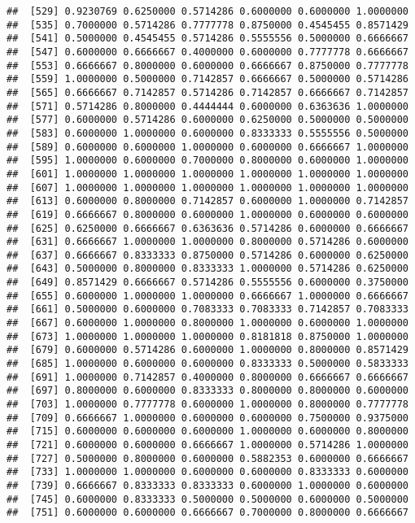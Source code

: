 \documentclass[]{article}
\begin{document}
\begin{verbatim}
##  [529] 0.9230769 0.6250000 0.5714286 0.6000000 0.6000000 1.0000000
##  [535] 0.7000000 0.5714286 0.7777778 0.8750000 0.4545455 0.8571429
##  [541] 0.5000000 0.4545455 0.5714286 0.5555556 0.5000000 0.6666667
##  [547] 0.6000000 0.6666667 0.4000000 0.6000000 0.7777778 0.6666667
##  [553] 0.6666667 0.8000000 0.6000000 0.6666667 0.8750000 0.7777778
##  [559] 1.0000000 0.5000000 0.7142857 0.6666667 0.5000000 0.5714286
##  [565] 0.6666667 0.7142857 0.5714286 0.7142857 0.6666667 0.7142857
##  [571] 0.5714286 0.8000000 0.4444444 0.6000000 0.6363636 1.0000000
##  [577] 0.6000000 0.5714286 0.6000000 0.6250000 0.5000000 0.5000000
##  [583] 0.6000000 1.0000000 0.6000000 0.8333333 0.5555556 0.5000000
##  [589] 0.6000000 0.6000000 1.0000000 0.6000000 0.6666667 1.0000000
##  [595] 1.0000000 0.6000000 0.7000000 0.8000000 0.6000000 1.0000000
##  [601] 1.0000000 1.0000000 1.0000000 1.0000000 1.0000000 1.0000000
##  [607] 1.0000000 1.0000000 1.0000000 1.0000000 1.0000000 1.0000000
##  [613] 0.6000000 0.8000000 0.7142857 0.6000000 1.0000000 0.7142857
##  [619] 0.6666667 0.8000000 0.6000000 1.0000000 0.6000000 0.6000000
##  [625] 0.6250000 0.6666667 0.6363636 0.5714286 0.6000000 0.6666667
##  [631] 0.6666667 1.0000000 1.0000000 0.8000000 0.5714286 0.6000000
##  [637] 0.6666667 0.8333333 0.8750000 0.5714286 0.6000000 0.6250000
##  [643] 0.5000000 0.8000000 0.8333333 1.0000000 0.5714286 0.6250000
##  [649] 0.8571429 0.6666667 0.5714286 0.5555556 0.6000000 0.3750000
##  [655] 0.6000000 1.0000000 1.0000000 0.6666667 1.0000000 0.6666667
##  [661] 0.5000000 0.6000000 0.7083333 0.7083333 0.7142857 0.7083333
##  [667] 0.6000000 1.0000000 0.8000000 1.0000000 0.6000000 1.0000000
##  [673] 1.0000000 1.0000000 1.0000000 0.8181818 0.8750000 1.0000000
##  [679] 0.6000000 0.5714286 0.6000000 1.0000000 0.8000000 0.8571429
##  [685] 1.0000000 0.6000000 0.6000000 0.8333333 0.5000000 0.5833333
##  [691] 1.0000000 0.7142857 0.4000000 0.8000000 0.6666667 0.6666667
##  [697] 0.8000000 0.6000000 0.8333333 0.8000000 0.8000000 0.6000000
##  [703] 1.0000000 0.7777778 0.6000000 1.0000000 0.8000000 0.7777778
##  [709] 0.6666667 1.0000000 0.6000000 0.6000000 0.7500000 0.9375000
##  [715] 0.6000000 0.6000000 0.6000000 1.0000000 0.6000000 0.8000000
##  [721] 0.6000000 0.6000000 0.6666667 1.0000000 0.5714286 1.0000000
##  [727] 0.5000000 0.8000000 0.6000000 0.5882353 0.6000000 0.6666667
##  [733] 1.0000000 1.0000000 0.6000000 0.6000000 0.8333333 0.6000000
##  [739] 0.6666667 0.8333333 0.8333333 0.6000000 1.0000000 0.6000000
##  [745] 0.6000000 0.8333333 0.5000000 0.5000000 0.6000000 0.5000000
##  [751] 0.6000000 0.6000000 0.6666667 0.7000000 0.8000000 0.6666667

\end{verbatim}
\end{document}
